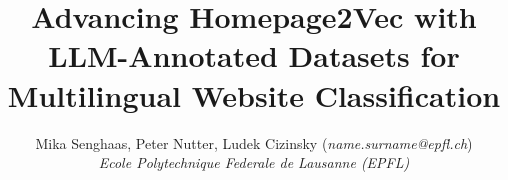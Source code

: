 \documentclass{article}
\begin{document}
\thispagestyle{empty} 

\title{
  Advancing Homepage2Vec with LLM-Annotated Datasets for Multilingual Website Classification
}

\author{
  Mika Senghaas, Peter Nutter, Ludek Cizinsky (\textit{name.surname@epfl.ch}) \\[0.5em]
  \textit{Ecole Polytechnique Federale de Lausanne (EPFL)}\\
}
\maketitle







\newpage



\newpage
\appendix


\end{document}

